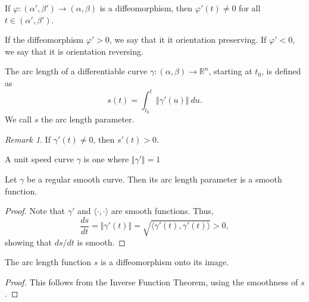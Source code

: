 \documentclass[11pt]{article}
\newcommand{\R}{\mathbb{R}}
\newcommand{\ip}[2]{\langle #1, #2 \rangle}
\newcommand{\norm}[1]{\Vert #1 \Vert}
\newcommand{\dd}[2]{\frac{d #1}{d #2}}
\theoremstyle{definition}
\theoremstyle{remark}
\newtheorem*{remark}{Remark}
\numberwithin{equation}{section}
\begin{document}
    \begin{lemma}
        If $\varphi\colon (\alpha', \beta') \to (\alpha, \beta)$ is a diffeomorphism,
        then $\varphi'(t) \neq 0$ for all $t \in (\alpha', \beta')$.
    \end{lemma}

    \begin{definition}
        If the diffeomorphism $\varphi' > 0$, we say that it it orientation
        preserving. If $\varphi' < 0$, we say that it is orientation reversing.
    \end{definition}

    \begin{definition}
        The arc length of a differentiable curve $\gamma\colon (\alpha, \beta) \to
        \R^n$, starting at $t_0$, is defined as \[
            s(t) = \int_{t_0}^t \norm{\gamma'(u)}\:du.
        \] We call $s$ the arc length parameter.

        \begin{remark}
            If $\gamma'(t) \neq 0$, then $s'(t) > 0$.
        \end{remark}
    \end{definition}

    \begin{definition}
        A unit speed curve $\gamma$ is one where $\norm{\gamma'} = 1$
    \end{definition}

    \begin{lemma}
        Let $\gamma$ be a regular smooth curve. Then its arc length parameter is a
        smooth function.
    \end{lemma}
    \begin{proof}
        Note that $\gamma'$ and $\ip{\cdot}{\cdot}$ are smooth functions. Thus, \[
            \dd{s}{t} = \norm{\gamma'(t)} = \sqrt{\ip{\gamma'(t)}{\gamma'(t)}} > 0,
        \] showing that $ds / dt$ is smooth.
    \end{proof}

    \begin{lemma}
        The arc length function $s$ is a diffeomorphism onto its image.
    \end{lemma}
    \begin{proof}
        This follows from the Inverse Function Theorem, using the smoothness of $s$.
    \end{proof}
\end{document}
